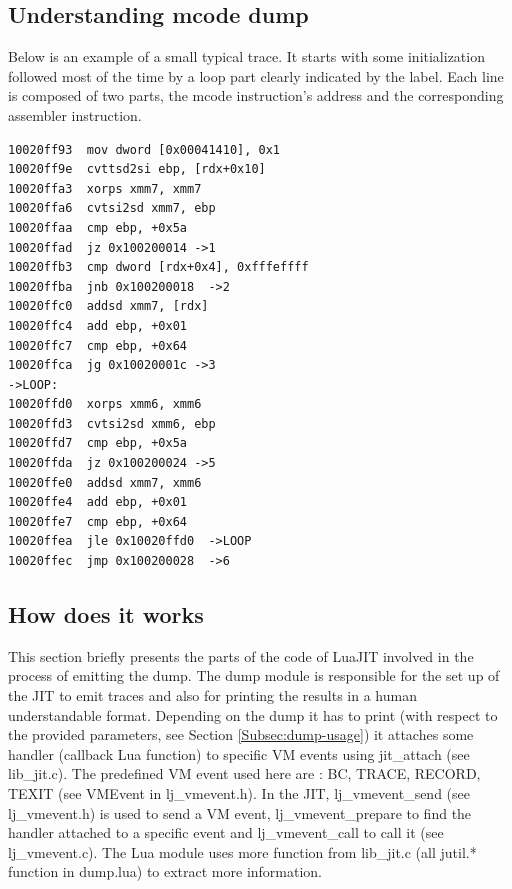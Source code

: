 \subsection{Understanding mcode dump}
\label{Subsec:dump-mcode}

Below is an example of a small typical trace. It starts with some initialization
followed most of the time by a loop part clearly indicated by the label.
Each line is composed of two parts, the mcode instruction's address and the
corresponding assembler instruction.
\begin{verbatim}
10020ff93  mov dword [0x00041410], 0x1
10020ff9e  cvttsd2si ebp, [rdx+0x10]
10020ffa3  xorps xmm7, xmm7
10020ffa6  cvtsi2sd xmm7, ebp
10020ffaa  cmp ebp, +0x5a
10020ffad  jz 0x100200014 ->1
10020ffb3  cmp dword [rdx+0x4], 0xfffeffff
10020ffba  jnb 0x100200018  ->2
10020ffc0  addsd xmm7, [rdx]
10020ffc4  add ebp, +0x01
10020ffc7  cmp ebp, +0x64
10020ffca  jg 0x10020001c ->3
->LOOP:
10020ffd0  xorps xmm6, xmm6
10020ffd3  cvtsi2sd xmm6, ebp
10020ffd7  cmp ebp, +0x5a
10020ffda  jz 0x100200024 ->5
10020ffe0  addsd xmm7, xmm6
10020ffe4  add ebp, +0x01
10020ffe7  cmp ebp, +0x64
10020ffea  jle 0x10020ffd0  ->LOOP
10020ffec  jmp 0x100200028  ->6
\end{verbatim}


\subsection{How does it works}
\label{Subsec:dump-internals}

This section briefly presents the parts of the code of LuaJIT involved in the process of
emitting the dump. The dump module is responsible for the set up of the
JIT to emit traces and also for printing the results in a human understandable
format. Depending on the dump it has to print (with respect to the provided
parameters, see Section \ref{Subsec:dump-usage}) it attaches some handler
(callback Lua function) to specific VM events using jit\_attach (see lib\_jit.c).
The predefined VM event used here are : BC, TRACE, RECORD, TEXIT
(see VMEvent in lj\_vmevent.h). In the JIT, lj\_vmevent\_send (see lj\_vmevent.h)
is used to send a VM event, lj\_vmevent\_prepare to find the handler attached to a
specific event and lj\_vmevent\_call to call it (see lj\_vmevent.c).
The Lua module uses more function from lib\_jit.c (all jutil.* function
in dump.lua) to extract more information.

